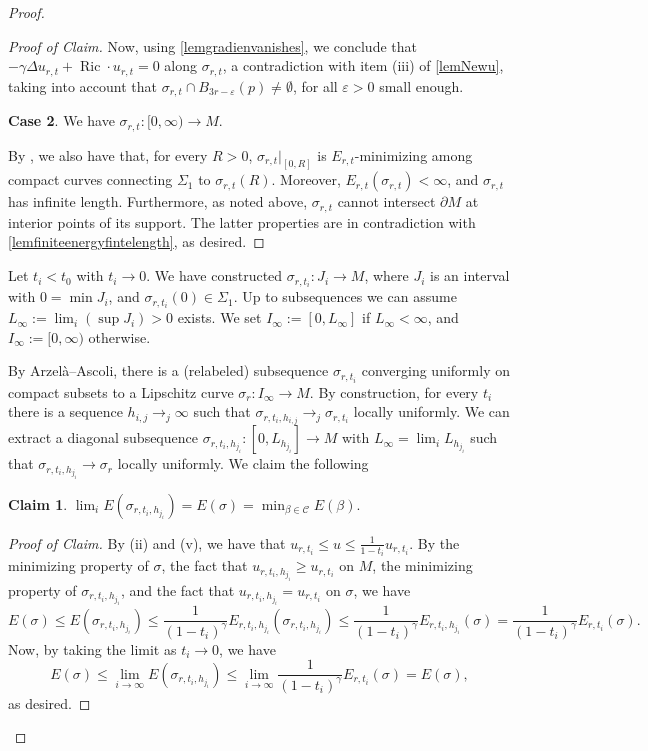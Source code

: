 \documentclass[12pt,a4paper,reqno]{amsart}
\theoremstyle{definition}
\newtheorem*{claim}{Claim}
\renewcommand{\leq}{\leqslant}
\renewcommand{\geq}{\geqslant}
\DeclareMathOperator{\Ric}{Ric}
\begin{document}
{\begin{proof}
\begin{proof}[Proof of Claim]
Now, using \cref{lemgradienvanishes}, we conclude that $-\gamma \Delta u_{r,t} + \Ric \cdot u_{r,t} = 0$ along $\sigma_{r,t}$, a contradiction with item (iii) of \cref{lemNewu}, taking into account that $\sigma_{r,t}\cap B_{3r-\varepsilon}(p)\neq \emptyset$, for all $\varepsilon>0$ small enough.

\textbf{Case 2}. We have $\sigma_{r,t}:[0,\infty)\to M$.

By  , we also have that, for every $R>0$, $\sigma_{r,t}|_{[0,R]}$ is $E_{r,t}$-minimizing among compact curves connecting $\Sigma_1$ to $\sigma_{r,t}(R)$. Moreover, $E_{r,t}(\sigma_{r,t})<\infty$, and $\sigma_{r,t}$ has infinite length. Furthermore, as noted above, $\sigma_{r,t}$ cannot intersect $\partial M$ at interior points of its support. The latter properties are in contradiction with \cref{lemfiniteenergyfintelength}, as desired.
\end{proof}

{
Let $t_i<t_0$ with $t_i\to 0$. We have constructed $\sigma_{r,t_i}:J_i\to M$, where $J_i$ is an interval with $0=\min J_i$, and $\sigma_{r,t_i}(0)\in\Sigma_1$. Up to subsequences we can assume $L_\infty:=\lim_i(\sup J_i)>0$ exists. We set $I_\infty:=[0,L_\infty]$ if $L_\infty<\infty$, and $I_\infty:=[0,\infty)$ otherwise.

By Arzelà--Ascoli, 
there is a (relabeled) subsequence $\sigma_{r,t_i}$ converging uniformly on compact subsets to a Lipschitz curve $\sigma_r:I_\infty\to M$. By construction, for every $t_i$ there is a sequence $h_{i,j}\to_j \infty$ such that $\sigma_{r,t_i,h_{i,j}}\to_j \sigma_{r,t_i}$ locally uniformly. We can extract a diagonal subsequence $\sigma_{r,t_i,h_{j_i}}:[0,L_{h_{j_i}}]\to M$ with $L_\infty=\lim_i L_{h_{j_i}}$ such that $\sigma_{r,t_i,h_{j_i}}\to\sigma_r$ locally uniformly. We claim the following
{{
\begin{claim}
    $\lim_i E(\sigma_{r,t_i,h_{j_i}}) = E(\sigma)=\min_{\beta\in\mathcal{C}} E(\beta)$.
\end{claim}
\begin{proof}[Proof of Claim]
    By  (ii) and (v), we have that $u_{r,t_i}\leq u\leq \frac{1}{1-t_i}u_{r,t_i}$. By the minimizing property of $\sigma$, the fact that $u_{r,t_i,h_{j_i}}\geq u_{r,t_i}$ on $M$, the minimizing property of $\sigma_{r,t_i,h_{j_i}}$, and the fact that $u_{r,t_i,h_{j_i}}=u_{r,t_i}$ on $\sigma$,  we have
    \[
    E(\sigma)\le E(\sigma_{r,t_i,h_{j_i}})\leq \frac{1}{(1-t_i)^\gamma} E_{r,t_i,h_{j_i}}(\sigma_{r,t_i,h_{j_i}})\leq \frac{1}{(1-t_i)^\gamma}E_{r,t_i,h_{j_i}}(\sigma) = \frac{1}{(1-t_i)^\gamma}E_{r,t_i}(\sigma).
    \]
    Now, by taking the limit as $t_i\to 0$, we have 
    \[
    E(\sigma)\leq \lim_{i\to\infty} E(\sigma_{r,t_i,h_{j_i}}) \leq \lim_{i\to\infty}\frac{1}{(1-t_i)^\gamma}E_{r,t_i}(\sigma)= E(\sigma),
    \]
as desired.
\end{proof}

}}}
\end{proof}}
\end{document}
